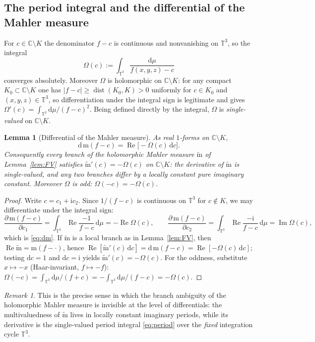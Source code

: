 \documentclass[11pt]{article}
\newtheorem{lemma}[theorem]{Lemma}
\theoremstyle{definition}
\theoremstyle{remark}
\newtheorem{remark}[theorem]{Remark}
\newcommand{\Cc}{\mathbb{C}}
\newcommand{\Tt}{\mathbb{T}}
\newcommand{\ii}{\mathrm{i}}
\newcommand{\id}{\mathrm{d}}
\newcommand{\ImT}{\operatorname{Im}}
\newcommand{\ReT}{\operatorname{Re}}
\newcommand{\m}{\mathrm{m}}
\newcommand{\mt}{\widetilde{\m}}
\begin{document}
\subsection{The period integral and the differential of the Mahler measure}\label{subsec:period}

For $c\in\Cc\setminus K$ the denominator $f-c$ is continuous and
nonvanishing on $\Tt^3$, so the integral
\begin{equation}\label{eq:period}
  \Omega(c):=\int_{\Tt^3}\frac{\id\mu}{f(x,y,z)-c}
\end{equation}
converges absolutely. Moreover $\Omega$ is holomorphic on
$\Cc\setminus K$: for any compact $K_0\subset\Cc\setminus K$ one has
$|f-c|\ge\operatorname{dist}(K_0,K)>0$ uniformly for $c\in K_0$ and
$(x,y,z)\in\Tt^3$, so differentiation under the integral sign is legitimate
and gives $\Omega'(c)=\int_{\Tt^3}\id\mu/(f-c)^2$. Being defined directly
by the integral, $\Omega$ is \emph{single-valued} on $\Cc\setminus K$.

\begin{lemma}[Differential of the Mahler measure]\label{lem:period}
As real $1$-forms on $\Cc\setminus K$,
\begin{equation}\label{eq:dm}
  \id\,\m(f-c)=\ReT\bigl[-\Omega(c)\,\id c\bigr].
\end{equation}
Consequently every branch of the holomorphic Mahler measure $\mt$ of
Lemma~\ref{lem:FV} satisfies $\mt'(c)=-\Omega(c)$ on $\Cc\setminus K$: the
derivative of $\mt$ is single-valued, and any two branches differ by a
locally constant pure imaginary constant. Moreover $\Omega$ is odd:
$\Omega(-c)=-\Omega(c)$.
\end{lemma}
\begin{proof}
Write $c=c_1+\ii c_2$. Since $1/(f-c)$ is continuous on $\Tt^3$ for
$c\notin K$, we may differentiate under the integral sign:
\[
  \frac{\partial\,\m(f-c)}{\partial c_1}
  =\int_{\Tt^3}\ReT\frac{-1}{f-c}\,\id\mu=-\ReT\Omega(c),\qquad
  \frac{\partial\,\m(f-c)}{\partial c_2}
  =\int_{\Tt^3}\ReT\frac{-\ii}{f-c}\,\id\mu=\ImT\Omega(c),
\]
which is \eqref{eq:dm}. If $\mt$ is a local branch as in
Lemma~\ref{lem:FV}, then $\ReT\mt=\m(f-\cdot)$, hence
$\ReT[\mt'(c)\,\id c]=\id\,\m(f-c)=\ReT[-\Omega(c)\,\id c]$; testing
$\id c=1$ and $\id c=\ii$ yields $\mt'(c)=-\Omega(c)$. For the oddness,
substitute $x\mapsto -x$ (Haar-invariant, $f\mapsto -f$):
$\Omega(-c)=\int_{\Tt^3}\id\mu/(f+c)=-\int_{\Tt^3}\id\mu/(f-c)=-\Omega(c)$.
\end{proof}

\begin{remark}
This is the precise sense in which the branch ambiguity of the holomorphic
Mahler measure is invisible at the level of differentials: the
multivaluedness of $\mt$ lives in locally constant imaginary periods,
while its derivative is the single-valued period integral
\eqref{eq:period} over the \emph{fixed} integration cycle $\Tt^3$.
\end{remark}
\end{document}
